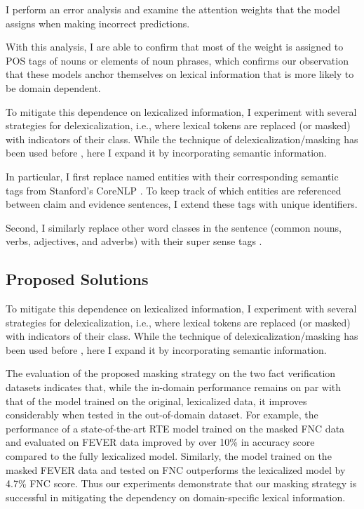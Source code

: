 \documentclass[conference,onecolumn]{IEEEtran}
\begin{document}
 
 {} I perform an error analysis and examine the attention weights that the model  assigns when making incorrect predictions.
 
 With this analysis, I are able to confirm that most of the weight is assigned to POS tags of nouns or elements of noun phrases, which confirms our observation that these models anchor themselves on lexical information that is more likely to be domain dependent. 
 
{} To mitigate this dependence on lexicalized information, I experiment with several strategies for delexicalization, i.e., where lexical tokens are replaced (or masked) with indicators of their class. While the technique of delexicalization/masking has been used before \cite[e.g.,]{zeman2008cross}, here I expand it by incorporating semantic information. 



 
In particular, I first replace named entities with their corresponding semantic tags from Stanford's CoreNLP \cite{manning2014stanford}. 
To keep track of which entities are referenced between claim and evidence sentences, I extend these tags with unique identifiers. 

Second, I similarly replace other word classes in the sentence (common nouns, verbs, adjectives, and adverbs)  with their super sense tags \cite{ciaramita2003supersense}.



{}  

\subsection{Proposed Solutions}
To mitigate this dependence on lexicalized information, I experiment with several strategies for delexicalization, i.e., where lexical tokens are replaced (or masked) with indicators of their class. While the technique of delexicalization/masking has been used before \cite[e.g.,]{zeman2008cross}, here I expand it by incorporating semantic information. 


The evaluation of the proposed masking strategy on the two fact verification datasets indicates that,
while the in-domain performance remains on par with that of the model trained on the original, lexicalized data, it improves considerably when tested in the out-of-domain dataset. 
For example, the performance of a state-of-the-art RTE model trained on the masked FNC data and evaluated on FEVER data improved by over 10\% in accuracy score compared to the fully lexicalized model. Similarly, the model trained on the masked FEVER data and tested on FNC outperforms the lexicalized model by 4.7\% FNC score.
Thus our experiments demonstrate that our masking strategy is successful in mitigating the dependency on domain-specific lexical information.
\end{document}
